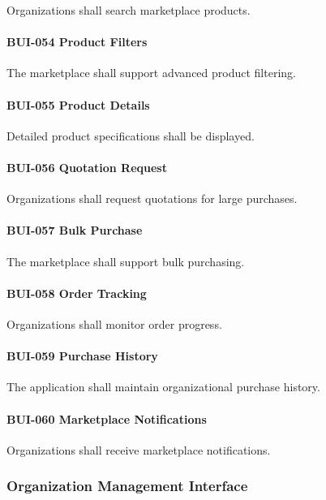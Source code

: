 Organizations shall search marketplace products.

\paragraph{BUI-054 Product Filters}

The marketplace shall support advanced product filtering.

\paragraph{BUI-055 Product Details}

Detailed product specifications shall be displayed.

\paragraph{BUI-056 Quotation Request}

Organizations shall request quotations for large purchases.

\paragraph{BUI-057 Bulk Purchase}

The marketplace shall support bulk purchasing.

\paragraph{BUI-058 Order Tracking}

Organizations shall monitor order progress.

\paragraph{BUI-059 Purchase History}

The application shall maintain organizational purchase history.

\paragraph{BUI-060 Marketplace Notifications}

Organizations shall receive marketplace notifications.


\subsubsection*{Organization Management Interface}


